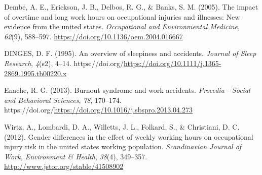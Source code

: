\documentclass[
  12pt,
]{article}
\newlength{\cslhangindent}
\newlength{\cslentryspacingunit} %
\newenvironment{CSLReferences}[2] %
 {%
  \setlength{\parindent}{0pt}
  \ifodd #1
  \let\oldpar\par
  \def\par{\hangindent=\cslhangindent\oldpar}
  \fi
  \setlength{\parskip}{#2\cslentryspacingunit}
 }%
 {}
\begin{document}
\hypertarget{refs}{}
\begin{CSLReferences}{1}{0}
\leavevmode{}%
Dembe, A. E., Erickson, J. B., Delbos, R. G., \& Banks, S. M. (2005). The impact of overtime and long work hours on occupational injuries and illnesses: New evidence from the united states. \emph{Occupational and Environmental Medicine}, \emph{62}(9), 588--597. \url{https://doi.org/10.1136/oem.2004.016667}

\leavevmode{}%
DINGES, D. F. (1995). An overview of sleepiness and accidents. \emph{Journal of Sleep Research}, \emph{4}(s2), 4--14. https://doi.org/\url{https://doi.org/10.1111/j.1365-2869.1995.tb00220.x}

\leavevmode{}%
Enache, R. G. (2013). Burnout syndrome and work accidents. \emph{Procedia - Social and Behavioral Sciences}, \emph{78}, 170--174. https://doi.org/\url{https://doi.org/10.1016/j.sbspro.2013.04.273}

\leavevmode{}%
Wirtz, A., Lombardi, D. A., Willetts, J. L., Folkard, S., \& Christiani, D. C. (2012). Gender differences in the effect of weekly working hours on occupational injury risk in the united states working population. \emph{Scandinavian Journal of Work, Environment \& Health}, \emph{38}(4), 349--357. \url{http://www.jstor.org/stable/41508902}

\end{CSLReferences}
\end{document}
